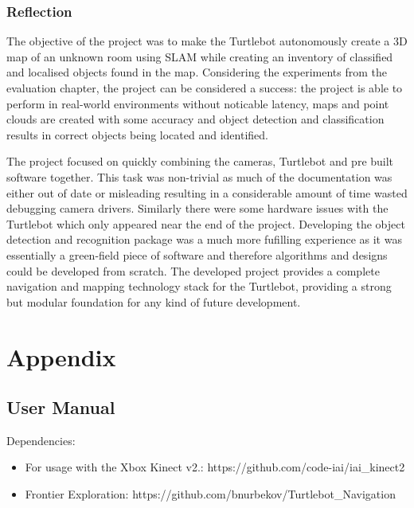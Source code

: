 \documentclass{mproj}
\begin{document}
\subsection{Reflection}

The objective of the project was to make the Turtlebot autonomously create a 3D map of an unknown room using SLAM while creating an inventory of classified and localised objects found in the map. Considering the experiments from the evaluation chapter, the project can be considered a success: the project is able to perform in real-world environments without noticable latency, maps and point clouds are created with some accuracy and object detection and classification results in correct objects being located and identified.
 
The project focused on quickly combining the cameras, Turtlebot and pre built software together. This task was non-trivial as much of the documentation was either out of date or misleading resulting in a considerable amount of time wasted debugging camera drivers. Similarly there were some hardware issues with the Turtlebot which only appeared near the end of the project. Developing the object detection and recognition package was a much more fufilling experience as it was essentially a green-field piece of software and therefore algorithms and designs could be developed from scratch. The developed project provides a complete navigation and mapping technology stack for the Turtlebot, providing a strong but modular foundation for any kind of future development. 





\appendix %
\chapter{Appendix}

\section{User Manual}

Dependencies:

\begin{itemize}
 \item For usage with the Xbox Kinect v2.: https://github.com/code-iai/iai\_kinect2
 \item Frontier Exploration: https://github.com/bnurbekov/Turtlebot\_Navigation
\end{itemize}
\end{document}

